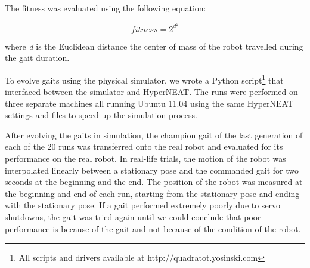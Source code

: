 The fitness was evaluated using the following equation:

\begin{equation}
fitness = 2^{d^{2}}
\end{equation}

where \emph{d} is the Euclidean distance the center of mass of the robot travelled during the gait duration. %



To evolve gaits using the physical simulator, we wrote a Python script\footnote{All scripts and drivers available at http://quadratot.yosinski.com} that interfaced between the simulator and HyperNEAT. %
The runs were performed on three separate machines all running Ubuntu 11.04 using the same HyperNEAT settings and files to speed up the simulation process.


After evolving the gaits in simulation, the champion gait of the last generation of each of the 20 runs was transferred onto the real robot and evaluated for its performance on the real robot.
In real-life trials, the motion of the robot was interpolated linearly between a stationary pose and the commanded gait for two seconds at the beginning and the end. %
The position of the robot was measured at the beginning and end of each run, starting from the stationary pose and ending with the stationary pose. 
If a gait performed extremely poorly due to servo shutdowns, the gait was tried again until we could conclude that poor performance is because of the gait and not because of the condition of the robot.

